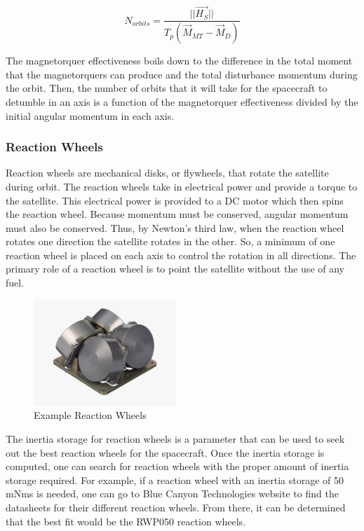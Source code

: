 \documentclass{article}
\begin{document}
\begin{equation}
  N_{orbits} = \frac{||\vec{H_S}||}{T_p(\vec{M}_{MT}-\vec{M}_D)}
\end{equation}

The magnetorquer effectiveness boils down to the difference in the
total moment that the magnetorquers can produce and the total
disturbance momentum during the orbit. Then, the number of orbits that
it will take for the spacecraft to detumble in an axis is a function
of the magnetorquer effectiveness divided by the initial angular
momentum in each axis.

\subsubsection{Reaction Wheels}

Reaction wheels are mechanical disks, or flywheels, that rotate the
satellite during orbit. The reaction wheels take in electrical power
and provide a torque to the satellite\cite{qp18}. This electrical power is
provided to a DC motor which then spins the reaction wheel. Because
momentum must be conserved, angular momentum must also be
conserved. Thus, by Newton’s third law, when the reaction wheel
rotates one direction the satellite rotates in the other. So, a
minimum of one reaction wheel is placed on each axis to control the
rotation in all directions. The primary role of a reaction wheel is to
point the satellite without the use of any fuel.
\begin{figure}[H]
  \begin{center}
  \includegraphics[height=40mm]{Figures/ReactionWheels}
  \end{center}
  \caption{Example Reaction Wheels\cite{qp19}}
\end{figure}

The inertia storage for reaction wheels is a parameter that can be
used to seek out the best reaction wheels for the spacecraft. Once the
inertia storage is computed, one can search for reaction wheels with
the proper amount of inertia storage required. For example, if a
reaction wheel with an inertia storage of 50 mNms is needed, one can
go to Blue Canyon Technologies website to find the datasheets for
their different reaction wheels. From there, it can be determined that
the best fit would be the RWP050 reaction wheels\cite{qp20}.
\end{document}
